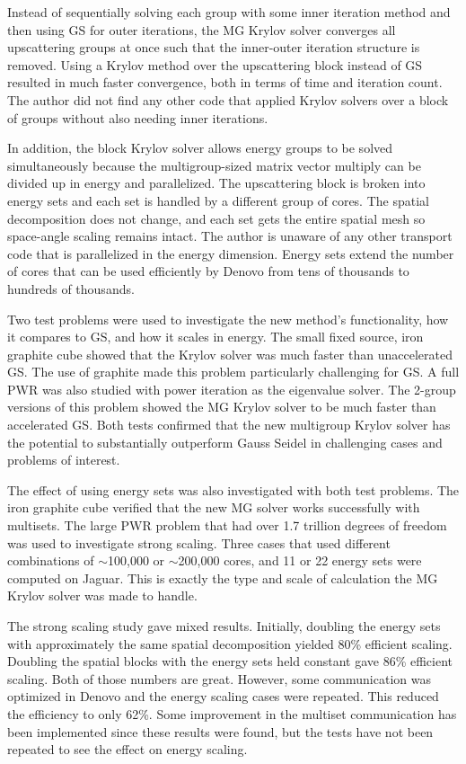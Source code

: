 Instead of sequentially solving each group with some inner iteration method and then using GS for outer iterations, the MG Krylov solver converges all upscattering groups at once such that the inner-outer iteration structure is removed. Using a Krylov method over the upscattering block instead of GS resulted in much faster convergence, both in terms of time and iteration count. The author did not find any other code that applied Krylov solvers over a block of groups without also needing inner iterations. 

In addition, the block Krylov solver allows energy groups to be solved simultaneously because the multigroup-sized matrix vector multiply can be divided up in energy and parallelized. The upscattering block is broken into energy sets and each set is handled by a different group of cores. The spatial decomposition does not change, and each set gets the entire spatial mesh so space-angle scaling remains intact. The author is unaware of any other \Sn transport code that is parallelized in the energy dimension. Energy sets extend the number of cores that can be used efficiently by Denovo from tens of thousands to hundreds of thousands. 

Two test problems were used to investigate the new method's functionality, how it compares to GS, and how it scales in energy. The small fixed source, iron graphite cube showed that the Krylov solver was much faster than unaccelerated GS. The use of graphite made this problem particularly challenging for GS. A full PWR was also studied with power iteration as the eigenvalue solver. The 2-group versions of this problem showed the MG Krylov solver to be much faster than accelerated GS. Both tests confirmed that the new multigroup Krylov solver has the potential to substantially outperform Gauss Seidel in challenging cases and problems of interest.  

The effect of using energy sets was also investigated with both test problems. The iron graphite cube verified that the new MG solver works successfully with multisets. The large PWR problem that had over 1.7 trillion degrees of freedom was used to investigate strong scaling. Three cases that used different combinations of $\sim$100,000 or $\sim$200,000 cores, and 11 or 22 energy sets were computed on Jaguar. This is exactly the type and scale of calculation the MG Krylov solver was made to handle.

The strong scaling study gave mixed results. Initially, doubling the energy sets with approximately the same spatial decomposition yielded 80\% efficient scaling. Doubling the spatial blocks with the energy sets held constant gave 86\% efficient scaling. Both of those numbers are great. However, some communication was optimized in Denovo and the energy scaling cases were repeated. This reduced the efficiency to only 62\%. Some improvement in the multiset communication has been implemented since these results were found, but the tests have not been repeated to see the effect on energy scaling. 

